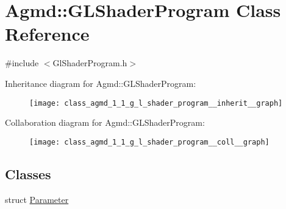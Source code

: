 \hypertarget{class_agmd_1_1_g_l_shader_program}{\section{Agmd\+:\+:G\+L\+Shader\+Program Class Reference}
\label{class_agmd_1_1_g_l_shader_program}
}


{\ttfamily \#include $<$Gl\+Shader\+Program.\+h$>$}



Inheritance diagram for Agmd\+:\+:G\+L\+Shader\+Program\+:\nopagebreak
\begin{figure}[H]
\begin{center}
\leavevmode
\texttt{[image: class\_agmd\_1\_1\_g\_l\_shader\_program\_\_inherit\_\_graph]}
\end{center}
\end{figure}


Collaboration diagram for Agmd\+:\+:G\+L\+Shader\+Program\+:\nopagebreak
\begin{figure}[H]
\begin{center}
\leavevmode
\texttt{[image: class\_agmd\_1\_1\_g\_l\_shader\_program\_\_coll\_\_graph]}
\end{center}
\end{figure}
\subsection*{Classes}
\begin{DoxyCompactItemize}
\item 
struct \hyperlink{struct_agmd_1_1_g_l_shader_program_1_1_parameter}{Parameter}
\end{DoxyCompactItemize}
